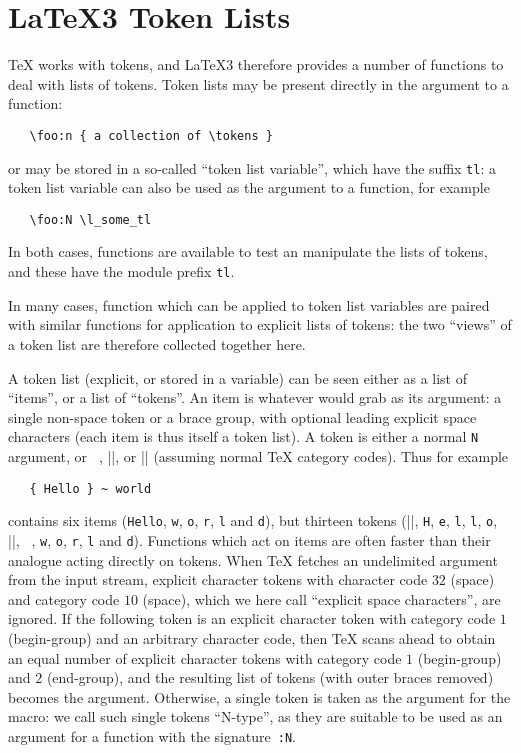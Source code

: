 \chapter{LaTeX3 Token Lists}

 \TeX{} works with tokens, and \LaTeX3 therefore provides a number of
 functions to deal with lists of tokens.  Token lists may be present
 directly in the argument to a function:
 \begin{verbatim}
   \foo:n { a collection of \tokens }
 \end{verbatim}
 or may be stored in a so-called \enquote{token list variable}, which
 have the suffix \texttt{tl}: a token list variable can also be used as
 the argument to a function, for example
 \begin{verbatim}
   \foo:N \l_some_tl
 \end{verbatim}
 In both cases, functions are available to test an manipulate the lists
 of tokens, and these have the module prefix \texttt{tl}.
 
 
 In many cases, function which can be applied to token list variables
 are paired with similar functions for application to explicit lists
 of tokens: the two \enquote{views} of a token list are therefore collected
 together here.

 A token list (explicit, or stored in a variable) can be seen either
 as a list of \enquote{items},
 or a list of \enquote{tokens}. An item is whatever  would
 grab as its argument: a single non-space token or a brace group,
 with optional leading explicit space characters (each item is thus
 itself a token list). A token is either a normal \texttt{N} argument,
 or \verb*| |, |{|, or |}| (assuming normal \TeX{} category codes).
 Thus for example
 \begin{verbatim}
   { Hello } ~ world
 \end{verbatim}
 contains six items (\texttt{Hello}, \texttt{w}, \texttt{o}, \texttt{r},
 \texttt{l} and \texttt{d}), but thirteen tokens (|{|, \texttt{H}, \texttt{e},
 \texttt{l}, \texttt{l}, \texttt{o}, |}|, \verb*| |, \texttt{w}, \texttt{o},
 \texttt{r}, \texttt{l} and \texttt{d}).
 Functions which act on items are often faster than their analogue acting
 directly on tokens.
%
   When \TeX{} fetches an undelimited argument from the input stream,
   explicit character tokens with character code $32$ (space) and
   category code $10$ (space), which we here call \enquote{explicit
     space characters}, are ignored.  If the following token is an
   explicit character token with category code $1$ (begin-group) and an
   arbitrary character code, then \TeX{} scans ahead to obtain an equal
   number of explicit character tokens with category code $1$
   (begin-group) and $2$ (end-group), and the resulting list of tokens
   (with outer braces removed) becomes the argument.  Otherwise, a
   single token is taken as the argument for the macro: we call such
   single tokens \enquote{N-type}, as they are suitable to be used as
   an argument for a function with the signature~\texttt{:N}.

